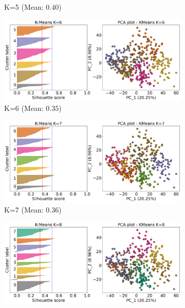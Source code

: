 \begin{figure}[!t]
\begin{subfigure}[!t]{0.49\textwidth}
        \caption{K=5 (Mean: $0.40$)}
    \end{subfigure}
    \centering
    \begin{subfigure}[!t]{0.49\textwidth}
        \includegraphics[width=\textwidth]{Sections/ClusteringAnalysis/Resources/cs_top3/sill_distrib/KMeans_6_sill_distrib.png}
        \caption{K=6 (Mean: $0.35$)}
    \end{subfigure}
    \centering
    \begin{subfigure}[!t]{0.49\textwidth}
        \includegraphics[width=\textwidth]{Sections/ClusteringAnalysis/Resources/cs_top3/sill_distrib/KMeans_7_sill_distrib.png}
        \caption{K=7 (Mean: $0.36$)}
    \end{subfigure}
    \centering
    \begin{subfigure}[!t]{0.49\textwidth}
        \includegraphics[width=\textwidth]{Sections/ClusteringAnalysis/Resources/cs_top3/sill_distrib/KMeans_8_sill_distrib.png}

\end{subfigure}
\end{figure}
